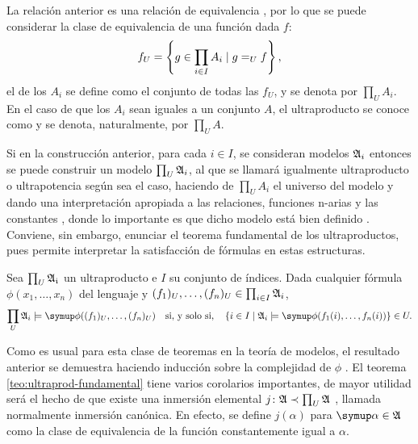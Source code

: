 La relación anterior es una relación de equivalencia \autocite[Proposición 4.1.5]{chang_model_2012},
por lo que se puede considerar la clase de equivalencia de una función dada $f$:
\[
    f_U = \left\{ g\in \prod_{i\in I} A_i\mid g=_U f \right\},
\]
el  de los $A_i$ se define como el conjunto de todas las $f_U$,
y se denota por $\prod_U A_i$. En el caso de que los $A_i$ sean iguales
a un conjunto $A$, el ultraproducto se conoce como  y se denota, naturalmente,
por $\prod_U A$.

Si en la construcción anterior, para cada $i\in I$, se consideran modelos $\mathfrak { A }_i$ entonces
se puede construir un modelo $\prod_U \mathfrak { A }_i$, al que se llamará igualmente
ultraproducto o ultrapotencia según sea el caso,
haciendo de $\prod_U A_i$ el universo del modelo y dando una
interpretación apropiada a las relaciones,
funciones n-arias y las constantes \autocite[Definición 4.1.6]{chang_model_2012}, donde lo importante es que
dicho modelo está bien definido \autocite[Proposición 4.1.7]{chang_model_2012}. Conviene, sin embargo, enunciar el teorema fundamental de los
ultraproductos, pues permite interpretar la satisfacción de fórmulas
en estas estructuras.
\begin{teo}\label{teo:ultraprod-fundamental}
    Sea $\prod_U \mathfrak { A_i }$ un ultraproducto e $I$ su conjunto de índices.
    Dada cualquier fórmula $\phi(x_1,\dots,x_n)$ del lenguaje y $(f_1)_U,\dots,(f_n)_U\in\prod_{i\in I} \mathfrak { A }_i$,
    \[
        \prod_U \model{A}_i\models\phi((f_1)_U,\dots,(f_n)_U)
        \quad\text{si, y solo si,}\quad
        \set{i\in I\mid \model{A}_i\models\phi(f_1(i),\dots,f_n(i))}\in U.
    \]
\end{teo}

Como es usual para esta clase de teoremas en la teoría de modelos,
el resultado anterior se demuestra haciendo inducción sobre la complejidad
de $\phi$ \autocite[Teorema 4.1.9]{chang_model_2012}.
El teorema \ref{teo:ultraprod-fundamental} tiene varios corolarios importantes, de mayor
utilidad será el hecho de que existe una inmersión elemental
$j\colon \mathfrak { A }\prec\prod_U\mathfrak { A }$ \autocite[Corolario 4.1.13]{chang_model_2012},
llamada normalmente inmersión canónica.
En efecto, se define $j(\alpha)$
para $\alpha\in\model{A}$ como la clase de equivalencia de la función constantemente
igual a $\alpha$.

